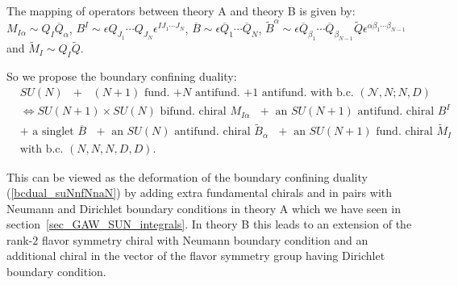 \documentclass[12pt]{article}
\numberwithin{equation}{section}
\begin{document}
The mapping of operators between theory A and theory B is given by:
$M_{I \alpha} \sim Q_I \overline{Q}_{\alpha}$, $B^I \sim \epsilon Q_{J_1} \cdots Q_{J_N} \epsilon^{I J_1 \cdots J_N}$, $\overline{B} \sim \epsilon \overline{Q}_1 \cdots \overline{Q}_N$, $\widetilde{B}^{\alpha} \sim \epsilon \overline{Q}_{\beta_1} \cdots \overline{Q}_{\beta_{N-1}} \widetilde{Q} \epsilon^{\alpha \beta_1 \cdots \beta_{N-1}}$ and $\widetilde{M}_I \sim Q_I \widetilde{Q}$.

So we propose the boundary confining duality: 
\begin{align}
\label{bcdual_suN_N+1_N+1}
&\textrm{$SU(N)$ $+$ $(N+1)$ fund. $+N$ antifund. $+1$ antifund. with b.c. $(\mathcal{N},N;N,D)$}
\nonumber\\
&\Leftrightarrow 
\textrm{
$SU(N+1)\times SU(N)$ bifund. chiral $M_{I\alpha}$ $+$ an $SU(N+1)$ antifund. chiral $B^I$}
\nonumber\\
&
\textrm{$+$ a singlet $\overline{B}$ 
$+$ an $SU(N)$ antifund. chiral $\widetilde{B}_{\alpha}$ 
$+$ an $SU(N+1)$ fund. chiral $\widetilde{M}_I$ 
}
\nonumber\\
&\textrm{
with b.c. $(N,N,N,D,D)$}. 
\end{align}

This can be viewed as the deformation of the boundary confining duality (\ref{bcdual_suNnfNnaN}) 
by adding extra fundamental chirals and in pairs with Neumann and Dirichlet boundary conditions in theory A which we have seen in section~\ref{sec_GAW_SUN_integrals}. 
In theory B this leads to an extension of the rank-$2$ flavor symmetry chiral 
with Neumann boundary condition and an additional chiral in the vector of the flavor symmetry group having Dirichlet boundary condition.
\end{document}

